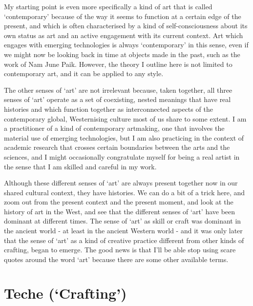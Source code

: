 \documentclass[letterpaper]{article}
\begin{document}
My starting point is even more specifically a kind of art that is called ‘contemporary’ because of the way it seems to function at a certain edge of the present, and which is often characterised by a kind of self-consciousness about its own status as art and an active engagement with its current context. Art which engages with emerging technologies is always ‘contemporary’ in this sense, even if we might now be looking back in time at objects made in the past, such as the work of Nam June Paik. However, the theory I outline here is not limited to contemporary art, and it can be applied to any style.

The other senses of ‘art’ are not irrelevant because, taken together, all three senses of ‘art’ operate as a set of coexisting, nested meanings that have real histories and which function together as interconnected aspects of the contemporary global, Westernising culture most of us share to some extent. I am a practitioner of a kind of contemporary artmaking, one that involves the material use of emerging technologies, but I am also practicing in the context of academic research that crosses certain boundaries between the arts and the sciences, and I might occasionally congratulate myself for being a real artist in the sense that I am skilled and careful in my work.

Although these different senses of ‘art’ are always present together now in our shared cultural context, they have histories. We can do a bit of a trick here, and zoom out from the present context and the present moment, and look at the history of art in the West, and see that the different senses of ‘art’ have been dominant at different times. The sense of ‘art’ as skill or craft was dominant in the ancient world - at least in the ancient Western world - and it was only later that the sense of ‘art’ as a kind of creative practice different from other kinds of crafting, began to emerge. The good news is that I'll be able stop using scare quotes around the word ‘art’ because there are some other available terms.

\section{Teche (‘Crafting’)}
\end{document}

